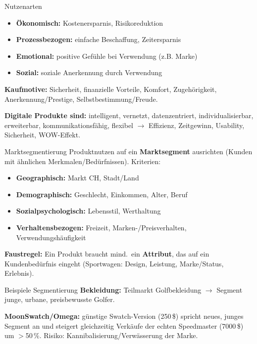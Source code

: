 \documentclass[a4paper, fontsize=7pt]{scrartcl}
\begin{document}
\begin{mainbox}{Nutzenarten}
\begin{itemize}
    \item \textbf{Ökonomisch:} Kostenersparnis, Risikoreduktion
    \item \textbf{Prozessbezogen:} einfache Beschaffung, Zeitersparnis
    \item \textbf{Emotional:} positive Gefühle bei Verwendung (z.B. Marke)
    \item \textbf{Sozial:} soziale Anerkennung durch Verwendung
\end{itemize}
\textbf{Kaufmotive:} Sicherheit, finanzielle Vorteile, Komfort,
Zugehörigkeit, Anerkennung/Prestige, Selbstbestimmung/Freude.

\textbf{Digitale Produkte sind:} intelligent, vernetzt, datenzentriert,
individualisierbar, erweiterbar, kommunikationsfähig, flexibel $\to$
Effizienz, Zeitgewinn, Usability, Sicherheit, WOW-Effekt.
\end{mainbox}

\begin{mainbox}{Marktsegmentierung}
Produktnutzen auf ein \textbf{Marktsegment} ausrichten (Kunden mit ähnlichen
Merkmalen/Bedürfnissen). Kriterien:
\begin{itemize}
    \item \textbf{Geographisch:} Markt CH, Stadt/Land
    \item \textbf{Demographisch:} Geschlecht, Einkommen, Alter, Beruf
    \item \textbf{Sozialpsychologisch:} Lebensstil, Werthaltung
    \item \textbf{Verhaltensbezogen:} Freizeit, Marken-/Preisverhalten,
    Verwendungshäufigkeit
\end{itemize}
\textbf{Faustregel:} Ein Produkt braucht mind.\ ein \textbf{Attribut}, das auf
ein Kundenbedürfnis eingeht (Sportwagen: Design, Leistung, Marke/Status,
Erlebnis).
\end{mainbox}

\begin{subbox}{Beispiele Segmentierung}
\textbf{Bekleidung:} Teilmarkt Golfbekleidung $\to$ Segment junge, urbane,
preisbewusste Golfer.

\textbf{MoonSwatch/Omega:} günstige Swatch-Version (250\,\$) spricht neues,
junges Segment an und steigert gleichzeitig Verkäufe der echten Speedmaster
(7000\,\$) um $>$50\,\%. Risiko: Kannibalisierung/Verwässerung der Marke.
\end{subbox}
\end{document}
